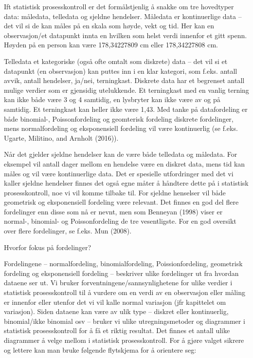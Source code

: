 \documentclass[
]{book}
\begin{document}
Ift statistisk prosesskontroll er det formålstjenlig å snakke om tre hovedtyper data: måledata, telledata og sjeldne hendelser. Måledata er kontinuerlige data -- det vil si de kan måles på en skala som høyde, vekt og tid. Her kan en observasjon/et datapunkt innta en hvilken som helst verdi innenfor et gitt spenn. Høyden på en person kan være 178,34227809 cm eller 178,34227808 cm.

Telledata et kategoriske (også ofte omtalt som diskrete) data -- det vil si et datapunkt (en observasjon) kan puttes inn i en klar kategori, som f.eks. antall avvik, antall hendelser, ja/nei, terningkast. Diskrete data har et begrenset antall mulige verdier som er gjensidig utelukkende. Et terningkast med en vanlig terning kan ikke både være 3 og 4 samtidig, en lysbryter kan ikke være av og på samtidig. Et terningkast kan heller ikke være 1,43. Med tanke på datafordeling er både binomial-, Poissonfordeling og geomterisk fordeling diskrete fordelinger, mens normalfordeling og eksponensiell fordeling vil være kontinuerlig (se f.eks. Ugarte, Militino, and Arnholt (2016)).

Når det gjelder sjeldne hendelser kan de være både telledata og måledata. For eksempel vil antall dager mellom en hendelse være en diskret data, mens tid kan måles og vil være kontinuerlige data. Det er spesielle utfordringer med det vi kaller sjeldne hendelser finnes det også egne måter å håndtere dette på i statistisk prosesskontroll, noe vi vil komme tilbake til. For sjeldne henselser vil både geometrisk og eksponensiell fordeling være relevant. Det finnes en god del flere fordelinger enn disse som nå er nevnt, men som Benneyan (1998) viser er normal-, binomial- og Poissonfordeling de tre vesentligste. For en god oversikt over flere fordelinger, se f.eks. Mun (2008).

Hvorfor fokus på fordelinger?

Fordelingene -- normalfordeling, binomialfordeling, Poissionfordeling, geometrisk fordeling og eksponensiell fordeling -- beskriver ulike fordelinger ut fra hvordan dataene ser ut. Vi bruker forventningene/sannsynlighetene for ulike verdier i statistisk prosesskontroll til å vurdere om en verdi av en observasjon eller måling er innenfor eller utenfor det vi vil kalle normal variasjon (jfr kapittelet om variasjon). Siden dataene kan være av ulik type -- diskret eller kontinuerlig, binomial/ikke binomial osv -- bruker vi ulike utregningsmetoder og diagrammer i statistisk prosesskontroll for å få et riktig resultat. Det finnes et antall ulike diagrammer å velge mellom i statistisk prosesskontroll. For å gjøre valget sikrere og lettere kan man bruke følgende flytskjema for å orientere seg:
\end{document}
